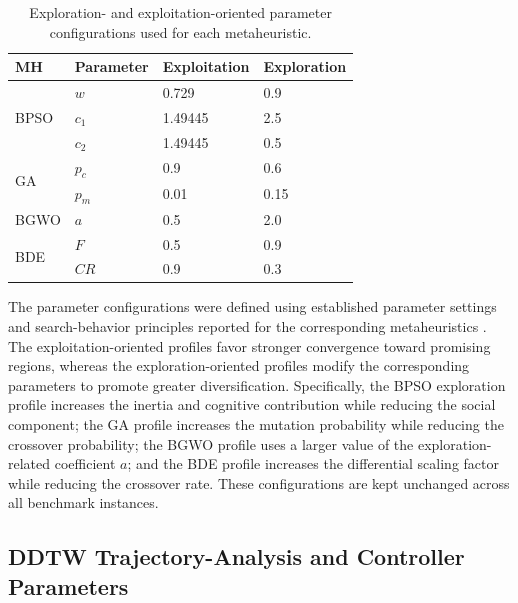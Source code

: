 \documentclass[journal,article,submit,moreauthors]{Definitions/mdpi}
\begin{document}
\begin{table}[htbp]
\centering
\caption{Exploration- and exploitation-oriented parameter configurations
used for each metaheuristic.}
\label{tab:mh_params}
\begin{tabular}{@{}l l l l@{}}
\toprule
\textbf{MH} &
\textbf{Parameter} &
\textbf{Exploitation} &
\textbf{Exploration} \\
\midrule

\multirow{3}{*}{BPSO}
  & $w$   & 0.729   & 0.9 \\
  & $c_1$ & 1.49445 & 2.5 \\
  & $c_2$ & 1.49445 & 0.5 \\

\midrule

\multirow{2}{*}{GA}
  & $p_c$ & 0.9  & 0.6 \\
  & $p_m$ & 0.01 & 0.15 \\

\midrule

BGWO
  & $a$ & 0.5 & 2.0 \\

\midrule

\multirow{2}{*}{BDE}
  & $F$  & 0.5 & 0.9 \\
  & $CR$ & 0.9 & 0.3 \\

\bottomrule
\end{tabular}
\end{table}

The parameter configurations were defined using established parameter
settings and search-behavior principles reported for the corresponding
metaheuristics \cite{clerc2002particle,goldberg1989genetic,
mirjalili2014grey,storn1997differential}. The exploitation-oriented profiles
favor stronger convergence toward promising regions, whereas the
exploration-oriented profiles modify the corresponding parameters to promote
greater diversification. Specifically, the BPSO exploration profile increases
the inertia and cognitive contribution while reducing the social component;
the GA profile increases the mutation probability while reducing the
crossover probability; the BGWO profile uses a larger value of the
exploration-related coefficient $a$; and the BDE profile increases the
differential scaling factor while reducing the crossover rate. These
configurations are kept unchanged across all benchmark instances.


\subsection{DDTW Trajectory-Analysis and Controller Parameters}
\label{sec:dtw_config}
\end{document}
